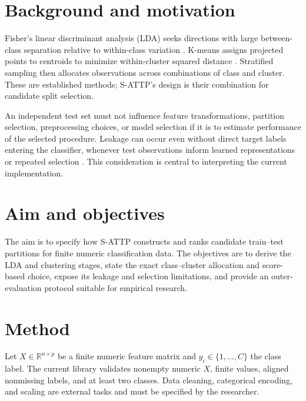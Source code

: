 \documentclass[conference]{IEEEtran}
\begin{document}
\section{Background and motivation}
Fisher's linear discriminant analysis (LDA) seeks directions with large between-class separation relative to within-class variation \cite{fisher1936,mclachlan2004}. K-means assigns projected points to centroids to minimize within-cluster squared distance \cite{lloyd1982,jain2010}. Stratified sampling then allocates observations across combinations of class and cluster. These are established methods; S-ATTP's design is their combination for candidate split selection.

An independent test set must not influence feature transformations, partition selection, preprocessing choices, or model selection if it is to estimate performance of the selected procedure. Leakage can occur even without direct target labels entering the classifier, whenever test observations inform learned representations or repeated selection \cite{kaufman2012}. This consideration is central to interpreting the current implementation.

\section{Aim and objectives}
The aim is to specify how S-ATTP constructs and ranks candidate train--test partitions for finite numeric classification data. The objectives are to derive the LDA and clustering stages, state the exact class--cluster allocation and score-based choice, expose its leakage and selection limitations, and provide an outer-evaluation protocol suitable for empirical research.

\section{Method}
Let \(X\in\mathbb{R}^{n\times p}\) be a finite numeric feature matrix and \(y_i\in\{1,\ldots,C\}\) the class label. The current library validates nonempty numeric \(X\), finite values, aligned nonmissing labels, and at least two classes. Data cleaning, categorical encoding, and scaling are external tasks and must be specified by the researcher.
\end{document}
